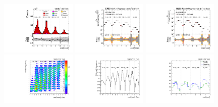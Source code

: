 \begin{refsection}
\begin{figure}[htb]
\begin{center}
 \includegraphics[width=0.32\textwidth]{fig_fullRun2UL/controlplots/combined/Hyp_LLBarCkk_vs_TTBarMass.pdf}
 \includegraphics[width=0.32\textwidth]{fig_fullRun2UL/unfolding/combined/UnfoldedResults_c_kk_mttbar.pdf}
 \includegraphics[width=0.32\textwidth]{fig_fullRun2UL/unfolding/combined/UnfoldedResultsNorm_c_kk_mttbar.pdf} \\
 \includegraphics[width=0.32\textwidth]{fig_fullRun2UL/unfolding/combined/ResponseMatrix_c_kk_mttbar.pdf}
 \includegraphics[width=0.32\textwidth]{fig_fullRun2UL/unfolding/combined/TotEff_c_kk_mttbar.pdf}
 \includegraphics[width=0.32\textwidth]{fig_fullRun2UL/unfolding/combined/PurStab_c_kk_mttbar.pdf} \\

\end{center}
\end{figure}
\end{refsection}
